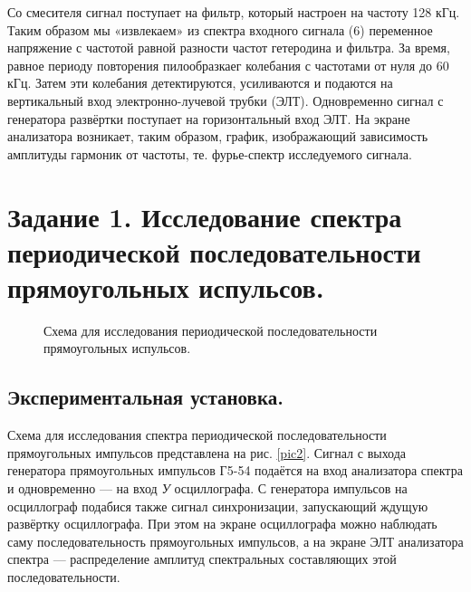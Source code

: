 \documentclass[a4paper,12pt]{article} %
\begin{document}
Со смесителя сигнал поступает на фильтр, который настроен на частоту 128 кГц. Таким образом мы «извлекаем» из спектра входного сигнала (6) переменное напряжение с частотой равной разности частот гетеродина и фильтра. За время, равное периоду повторения пилообразкаег колебания с частотами от нуля до 60 кГц. Затем эти колебания детектируются, усиливаются и подаются на вертикальный вход электронно-лучевой трубки (ЭЛТ). Одновременно сигнал с генератора развёртки поступает на горизонтальный вход ЭЛТ. На экране анализатора возникает, таким образом, график, изображающий зависимость амплитуды гармоник от частоты, те. фурье-спектр исследуемого сигнала.

\section{Задание 1. Исследование спектра периодической последовательности прямоугольных испульсов.}

\begin{figure}[H]\label{pic2}
 	\caption{Схема для исследования периодической последовательности прямоугольных испульсов.}
\end{figure}

\subsection{Экспериментальная установка.}

Схема для исследования спектра периодической последовательности прямоугольных импульсов представлена на рис. \eqref{pic2}. Сигнал с выхода генератора прямоугольных импульсов Г5-54 подаётся на вход анализатора спектра и одновременно — на вход \textit{У} осциллографа. С генератора импульсов на осциллограф подабися также сигнал синхронизации, запускающий ждущую развёртку осциллографа. При этом на экране осциллографа можно наблюдать саму последовательность прямоугольных импульсов, а на экране ЭЛТ анализатора спектра — распределение амплитуд спектральных составляющих этой последовательности.
\end{document}
